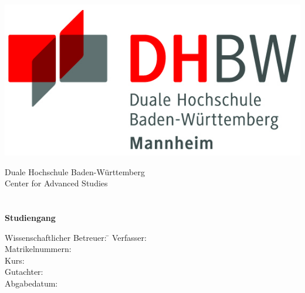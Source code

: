 \begin{titlepage}
    \begin{center}
        \includegraphics{images/logo}
        \vspace{2em}

        {\textsf{\large Duale Hochschule Baden-W\"urttemberg}}\\[1.5mm]
        {\textsf{\large Center for Advanced Studies}}\\[4em]

        {\textsf{\textbf{\large{\TheTypeOfWork}}}}\\[6mm]
        {\textsf{\textbf{\Large{}\TheTitle}}} \\[1.5cm]
        {\textsf{\textbf{\large{}Studiengang \TheFieldOfStudy}}\\[6mm]}

        \vfill

        \begin{minipage}{\textwidth}
            \begin{tabbing}
                Wissenschaftlicher Betreuer: \hspace{0.85cm}\=\kill
            Verfasser: \> \TheAuthor \\[1.5mm]
            Matrikelnummern: \> \TheMatriculationNumber \\[1.5mm]
            Kurs: \> \TheCourse \\[1.5mm]
            Gutachter: \> \TheCourseDirector \\[1.5mm]
            Abgabedatum: \> \TheSubmissionDate \\[1.5mm]
            \end{tabbing}
        \end{minipage}
    \end{center}
\end{titlepage}